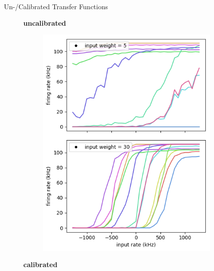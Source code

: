 \documentclass[12pt, aspectratio=169]{beamer}
\begin{document}
\begin{frame}{Un-/Calibrated Transfer Functions}
    \begin{figure}[!htb]
            \centering
            \textbf{uncalibrated}
            \begin{figure}
                \includegraphics[scale=0.44]{uncalibrated_activation_function_input.png}
                \label{membrane_potential}
            \end{figure}
      	\endminipage\hfill
            \centering
            \textbf{calibrated}
            \begin{figure}

\end{figure}
\end{figure}
\end{frame}
\end{document}
